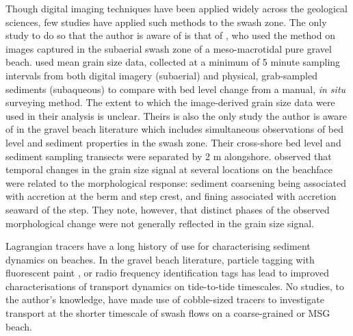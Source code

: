 Though digital imaging techniques have been applied widely across the geological sciences, few studies have applied such methods to the swash zone. The only study to do so that the author is aware of is that of \citet{Austin_Buscombe2008}, who used the \citet{Rubin2004} method on images captured in the subaerial swash zone of a meso-macrotidal pure gravel beach. \citeauthor{Austin_Buscombe2008} used mean grain size data, collected at a minimum of 5 minute sampling intervals from both digital imagery (subaerial) and physical, grab-sampled sediments (subaqueous) to compare with bed level change from a manual, \textit{in situ} surveying method. The extent to which the image-derived grain size data were used in their analysis is unclear. Theirs is also the only study the author is aware of in the gravel beach literature which includes simultaneous observations of bed level and sediment properties in the swash zone. Their cross-shore bed level and sediment sampling transects were separated by 2 m alongshore. \citeauthor{Austin_Buscombe2008} observed that temporal changes in the grain size signal at several locations on the beachface were related to the morphological response: sediment coarsening being associated with accretion at the berm and step crest, and fining associated with accretion seaward of the step. They note, however, that distinct phases of the observed morphological change were not generally reflected in the grain size signal.


Lagrangian tracers have a long history of use for characterising sediment dynamics on beaches. In the gravel beach literature, particle tagging with fluorescent paint \citep{Nordstrom_Jackson1993, Ciavola_Castiglione2009, Stark_Hay2016}, or radio frequency identification tags \citep[RFID;][]{Osborne2005, Allan_etal2006, Curtiss_etal2009, Dickson_etal2011, Miller_etal2011, Miller_Warrick2012, Bertoni_etal2012, Grottoli_etal2015, Grottoli_etal2019} has lead to improved characterisations of transport dynamics on tide-to-tide timescales. No studies, to the author's knowledge, have made use of cobble-sized tracers to investigate transport at the shorter timescale of swash flows on a coarse-grained or MSG beach. 


